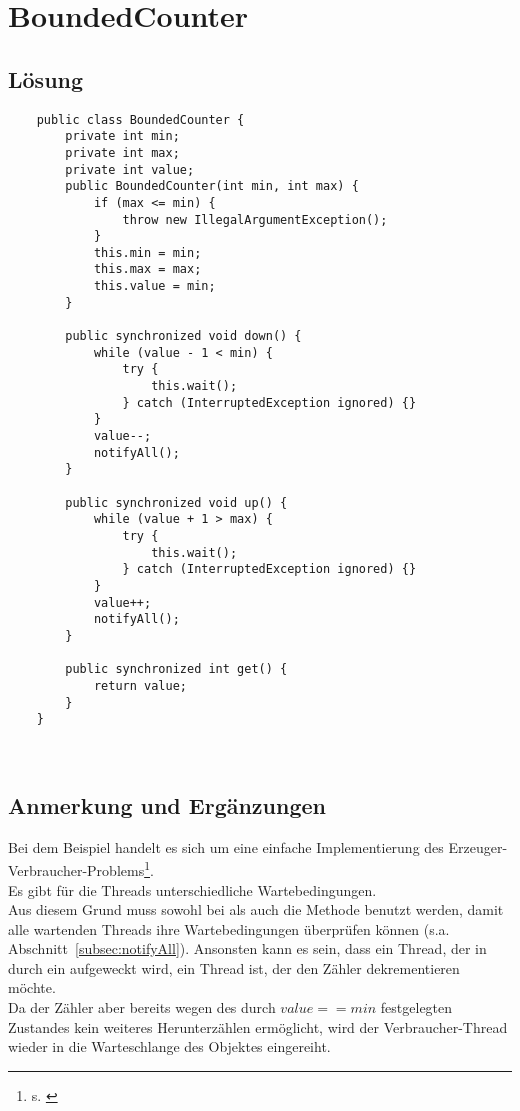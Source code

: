 \section{BoundedCounter}\label{ch:boundedcounter}


\subsection{Lösung}

\begin{verbatim}
    public class BoundedCounter {
        private int min;
        private int max;
        private int value;
        public BoundedCounter(int min, int max) {
            if (max <= min) {
                throw new IllegalArgumentException();
            }
            this.min = min;
            this.max = max;
            this.value = min;
        }

        public synchronized void down() {
            while (value - 1 < min) {
                try {
                    this.wait();
                } catch (InterruptedException ignored) {}
            }
            value--;
            notifyAll();
        }

        public synchronized void up() {
            while (value + 1 > max) {
                try {
                    this.wait();
                } catch (InterruptedException ignored) {}
            }
            value++;
            notifyAll();
        }

        public synchronized int get() {
            return value;
        }
    }
\end{verbatim}\\


\subsection{Anmerkung und Ergänzungen}

Bei dem Beispiel handelt es sich um eine einfache Implementierung des Erzeuger-Verbraucher-Problems\footnote{
s. \cite[Abschnitt 2.6.1]{Oec22}
}.\\
\noindent
Es gibt für die Threads unterschiedliche Wartebedingungen.\\
Aus diesem Grund muss sowohl bei  als auch  die Methode  benutzt werden, damit alle wartenden Threads ihre Wartebedingungen überprüfen können (s.a. Abschnitt~\ref{subsec:notifyAll}).
Ansonsten kann es sein, dass ein Thread, der in  durch ein   aufgeweckt wird, ein Thread ist, der den Zähler dekrementieren möchte.\\
Da der Zähler aber bereits wegen des durch $value == min$ festgelegten Zustandes kein weiteres Herunterzählen ermöglicht, wird der Verbraucher-Thread wieder in die Warteschlange des Objektes eingereiht.\\

